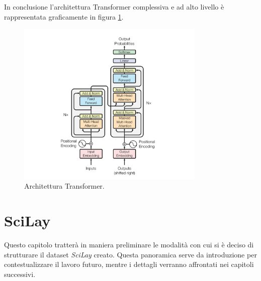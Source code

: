 \documentclass[12pt,a4paper,twoside,openright]{book}
\begin{document}
In conclusione l'architettura Transformer complessiva e ad alto livello è rappresentata graficamente in figura \ref{fig:transformer}.

\begin{figure} 
    \centering
    \includegraphics[width=0.8\textwidth]{images/transformer.png}
    \caption{Architettura Transformer.}
    \label{fig:transformer}
\end{figure}

































\chapter{SciLay}\label{cap:analisi_dati}

Questo capitolo tratterà in maniera preliminare le modalità con cui si è deciso di strutturare il dataset \emph{SciLay} creato. Questa panoramica serve da introduzione per contestualizzare il lavoro futuro, mentre i dettagli verranno affrontati nei capitoli successivi. 
\end{document}
